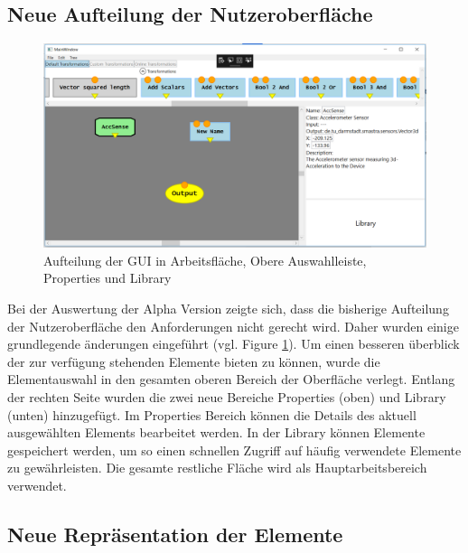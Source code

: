 \subsection{Neue Aufteilung der Nutzeroberfl\"ache}

\begin{figure} [h!]
	\centering
		\includegraphics[width = \textwidth]{Screenshots/Smastra_0_2_properties}
	\caption{Aufteilung der GUI in Arbeitsfl\"ache, Obere Auswahlleiste, Properties und Library}
	\label{fig:screenshot_0_2_properties}
\end{figure}

Bei der Auswertung der Alpha Version zeigte sich, dass die bisherige Aufteilung der Nutzeroberfl\"ache den Anforderungen nicht gerecht wird. Daher wurden einige grundlegende \"anderungen eingef\"uhrt (vgl. Figure \ref{fig:screenshot_0_2_properties}).
Um einen besseren \"uberblick der zur verf\"ugung stehenden Elemente bieten zu k\"onnen, wurde die Elementauswahl in den gesamten oberen Bereich der Oberfl\"ache verlegt.
Entlang der rechten Seite wurden die zwei neue Bereiche Properties (oben) und Library (unten) hinzugef\"ugt. Im Properties Bereich k\"onnen die Details des aktuell ausgew\"ahlten Elements bearbeitet werden.
In der Library k\"onnen Elemente gespeichert werden, um so einen schnellen Zugriff auf h\"aufig verwendete Elemente zu gew\"ahrleisten.
Die gesamte restliche Fl\"ache wird als Hauptarbeitsbereich verwendet. 
\\

\subsection{Neue Repr\"asentation der Elemente}


